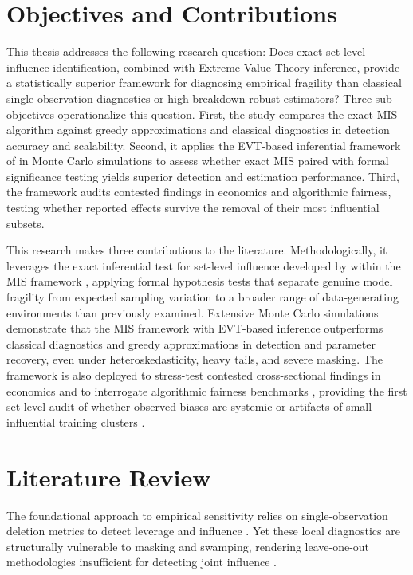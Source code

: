\documentclass[12pt]{article}
\begin{document}
\section{Objectives and Contributions}

This thesis addresses the following research question: Does exact set-level influence identification, combined with Extreme Value Theory inference, provide a statistically superior framework for diagnosing empirical fragility than classical single-observation diagnostics or high-breakdown robust estimators? Three sub-objectives operationalize this question. First, the study compares the exact MIS algorithm against greedy approximations and classical diagnostics in detection accuracy and scalability. Second, it applies the EVT-based inferential framework of \textcite{konrad2026testing} in Monte Carlo simulations to assess whether exact MIS paired with formal significance testing yields superior detection and estimation performance. Third, the framework audits contested findings in economics and algorithmic fairness, testing whether reported effects survive the removal of their most influential subsets.

This research makes three contributions to the literature. Methodologically, it leverages the exact inferential test for set-level influence developed by \textcite{konrad2026testing} within the MIS framework \parencite{kuschnig2021hidden}, applying formal hypothesis tests that separate genuine model fragility from expected sampling variation to a broader range of data-generating environments than previously examined. Extensive Monte Carlo simulations demonstrate that the MIS framework with EVT-based inference outperforms classical diagnostics and greedy approximations in detection and parameter recovery, even under heteroskedasticity, heavy tails, and severe masking. The framework is also deployed to stress-test contested cross-sectional findings in economics \parencite{nunn2012ruggedness, alsan2015effect} and to interrogate algorithmic fairness benchmarks \parencite{barocas2020hidden, ding2021retiring, jesus2022turning}, providing the first set-level audit of whether observed biases are systemic or artifacts of small influential training clusters \parencite{broderick2020automatic}.

\section{Literature Review}

The foundational approach to empirical sensitivity relies on single-observation deletion metrics to detect leverage and influence \parencite{cook1979influential, belsley2005regression}. Yet these local diagnostics are structurally vulnerable to masking and swamping, rendering leave-one-out methodologies insufficient for detecting joint influence \parencite{hadi1993procedures, rousseeuw1990unmasking, zhao2019multiple}.  
\end{document}
